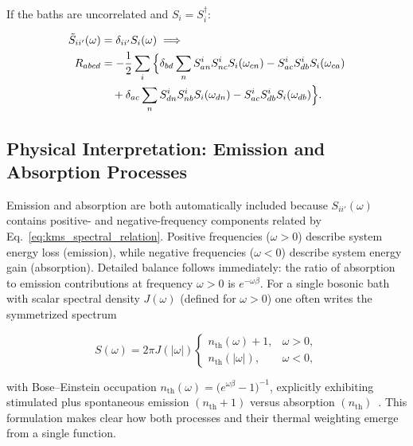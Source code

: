 \noindent
If the baths are uncorrelated and $S_i=S_i^\dagger$:

\begin{align}
\tilde{S}_{ii'}(\omega) &= \delta_{ii'} S_i(\omega) \implies \notag \\
R_{abcd} &= -\frac{1}{2} \sum_{i} \Big\{
\delta_{bd} \sum_n S^{i}_{an} S^{i}_{nc} S_{i}(\omega_{cn})
- S^{i}_{ac} S^{i}_{db} S_{i}(\omega_{ca}) \notag \\
&\quad + \delta_{ac} \sum_n S^{i}_{dn} S^{i}_{nb} S_{i}(\omega_{dn})
- S^{i}_{ac} S^{i}_{db} S_{i}(\omega_{db})
\Big\}.
\label{eq:Rabcd_uncor}
\end{align}


\subsection{Physical Interpretation: Emission and Absorption Processes}
\label{subsec:physical_emission_absorption}

\noindent
Emission and absorption are both automatically included because $S_{ii'}(\omega)$ contains positive- and negative-frequency components related by Eq.~\eqref{eq:kms_spectral_relation}. Positive frequencies ($\omega>0$) describe system energy loss (emission), while negative frequencies ($\omega<0$) describe system energy gain (absorption). Detailed balance follows immediately: the ratio of absorption to emission contributions at frequency $\omega>0$ is $e^{- \omega \beta}$. For a single bosonic bath with scalar spectral density $J(\omega)$ (defined for $\omega>0$) one often writes the symmetrized spectrum

\begin{equation}
	S(\omega) = 2\pi J(|\omega|) \begin{cases} n_{\text{th}}(\omega)+1, & \omega>0, \\ n_{\text{th}}(|\omega|), & \omega<0, \end{cases}
	\label{eq:bose_symmetric_spectrum}
\end{equation}

\noindent
with Bose--Einstein occupation $n_{\text{th}}(\omega) = \big(e^{\omega \beta}-1\big)^{-1}$, explicitly exhibiting stimulated plus spontaneous emission $(n_{\text{th}}+1)$ versus absorption $(n_{\text{th}})$~\cite{weiss2012quantumdissipativesystems}. This formulation makes clear how both processes and their thermal weighting emerge from a single function.


